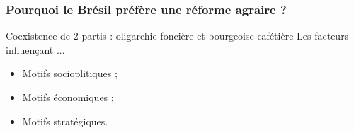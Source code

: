 \subsubsection{Pourquoi le Brésil préfère une réforme agraire ?}
\color{cyan}
Coexistence de 2 partis : oligarchie foncière et bourgeoise cafétière
Les facteurs influençant ...
\begin{itemize}
	\item Motifs socioplitiques ;
	\item Motifs économiques ;
	\item Motifs stratégiques.
\end{itemize}
\color{black}